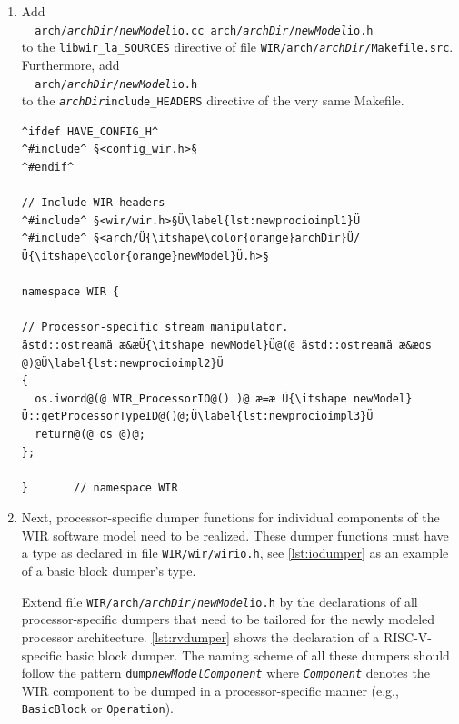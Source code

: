 \begin{enumerate}[resume]
  \item Add \\
  \verb|  arch/|\texttt{\itshape archDir}\verb|/|\texttt{\itshape newModel}\verb|io.cc arch/|\texttt{\itshape archDir}\verb|/|\texttt{\itshape newModel}\verb|io.h| \\
  to the \texttt{libwir\_la\_SOURCES} directive of file \texttt{WIR/arch/{\itshape archDir}/Makefile.src}.
  Furthermore, add \\
  \verb|  arch/|\texttt{\itshape archDir}\verb|/|\texttt{\itshape newModel}\verb|io.h| \\
  to the \texttt{{\itshape archDir}include\_HEADERS} directive of the very same Makefile.

\begin{lstlisting}[style=code,float=!b,caption={Rudimentary Implementation of a New Processor Model's Stream Output},label=lst:newprocioimpl]
^ifdef HAVE_CONFIG_H^
^#include^ §<config_wir.h>§
^#endif^

// Include WIR headers
^#include^ §<wir/wir.h>§Ü\label{lst:newprocioimpl1}Ü
^#include^ §<arch/Ü{\itshape\color{orange}archDir}Ü/Ü{\itshape\color{orange}newModel}Ü.h>§

namespace WIR {

// Processor-specific stream manipulator.
ästd::ostreamä æ&æÜ{\itshape newModel}Ü@(@ ästd::ostreamä æ&æos @)@Ü\label{lst:newprocioimpl2}Ü
{
  os.iword@(@ WIR_ProcessorIO@() )@ æ=æ Ü{\itshape newModel}Ü::getProcessorTypeID@()@;Ü\label{lst:newprocioimpl3}Ü
  return@(@ os @)@;
};

}       // namespace WIR
\end{lstlisting}

  \item Next, processor-specific dumper functions for individual components of the \gls{WIR} software model need to be realized.\label{enum:dumperdecl}
  These dumper functions must have a type as declared in file \texttt{WIR/wir/wirio.h}, see \cref{lst:iodumper} as an example of a basic block dumper's type.

  Extend file \texttt{WIR/arch/{\itshape archDir}/{\itshape newModel}io.h} by the declarations of all processor-specific dumpers that need to be tailored for the newly modeled processor architecture.
  \cref{lst:rvdumper} shows the declaration of a RISC-V-specific basic block dumper.
  The naming scheme of all these dumpers should follow the pattern \texttt{dump{\itshape newModelComponent}} where \texttt{\itshape Component} denotes the \gls{WIR} component to be dumped in a processor-specific manner (e.g., \texttt{BasicBlock} or \texttt{Operation}).


\end{enumerate}
